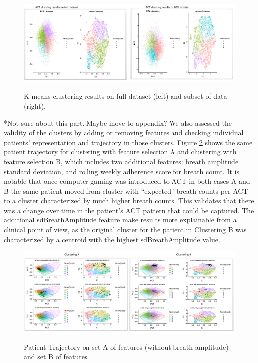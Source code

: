 \documentclass{article}
\begin{document}
\begin{figure}[!htb]
  \centering
  \caption{K-means clustering results on full dataset (left) and subset of data (right).}
  \includegraphics[]{ACTclusteringOn80.png}
  \label{fig:ACTclusteringon80}
\end{figure}

*Not sure about this part. Maybe move to appendix?
We also assessed the validity of the clusters by adding or removing features and checking individual patients’ representation and trajectory in those clusters. Figure \ref{fig:ACTclusteringAB} shows the same patient trajectory for clustering with feature selection A and clustering with feature selection B, which includes two additional features: breath amplitude standard deviation, and rolling weekly adherence score for breath count. It is notable that once computer gaming was introduced to ACT in both cases A and B the same patient moved from cluster with “expected” breath counts per ACT to a cluster characterized by much higher breath counts. This validates that there was a change over time in the patient’s ACT pattern that could be captured. The additional sdBreathAmplitude feature make results more explainable from a clinical point of view, as the original cluster for the patient in Clustering B was characterized by a centroid with the highest sdBreathAmplitude value. 

\begin{figure}[!htb]
  \centering
  \caption{Patient Trajectory on set A of features (without breath amplitude) and set B of features.}
  \includegraphics[]{ACTclusteringAB.png}
  \label{fig:ACTclusteringAB}
\end{figure}
\end{document}

